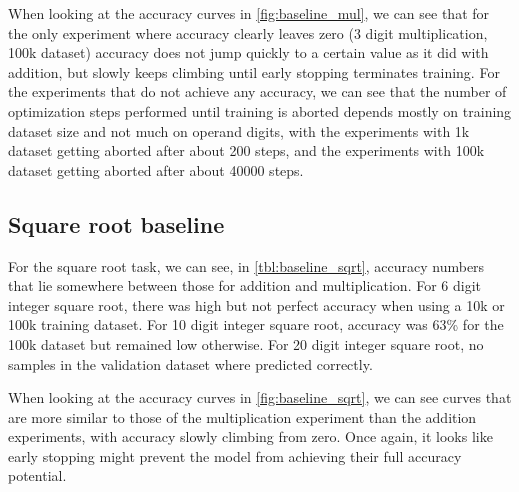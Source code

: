 When looking at the accuracy curves in  \cref{fig:baseline_mul}, we can see that for the only experiment where accuracy clearly leaves zero (3 digit multiplication, 100k dataset) accuracy does not jump quickly to a certain value as it did with addition, but slowly keeps climbing until early stopping terminates training.
For the experiments that do not achieve any accuracy, we can see that the number of optimization steps performed until training is aborted depends mostly on training dataset size and not much on operand digits, with the experiments with 1k dataset getting aborted after about 200 steps, and the experiments with 100k dataset getting aborted after about 40000 steps.



\subsection{Square root baseline}

For the square root task, we can see, in \cref{tbl:baseline_sqrt}, accuracy numbers that lie somewhere between those for addition and multiplication.
For 6 digit integer square root, there was high but not perfect accuracy when using a 10k or 100k training dataset.
For 10 digit integer square root, accuracy was 63\% for the 100k dataset but remained low otherwise. For 20 digit integer square root, no samples in the validation dataset where predicted correctly.

When looking at the accuracy curves in \cref{fig:baseline_sqrt}, we can see curves that are more similar to those of the multiplication experiment than the addition experiments, with accuracy slowly climbing from zero. Once again, it looks like early stopping might prevent the model from achieving their full accuracy potential.


